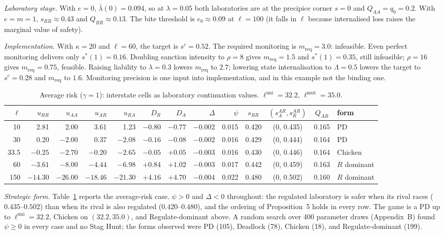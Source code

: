 \documentclass[11pt]{article}
\theoremstyle{plain}
\theoremstyle{definition}
\theoremstyle{remark}
\newcommand{\Lam}{\Lambda}
\newcommand{\Delt}{\Delta}
\newcommand{\lbar}{\bar\lambda}
\begin{document}
\emph{Laboratory stage.} With $e=0$, $\lbar(0)=0.094$, so at $\lambda=0.05$ both laboratories are at the precipice corner $s=0$ and $Q_{AA}=q_0=0.2$. With $e=m=1$, $s_{RR}\approx0.43$ and $Q_{RR}\approx0.13$. The bite threshold is $e_0\approx0.09$ at $\ell=100$ (it falls in $\ell$ because internalised loss raises the marginal value of safety).

\emph{Implementation.} With $\kappa=20$ and $\ell=60$, the target is $s^c=0.52$. The required monitoring is $m_{\mathrm{req}}=3.0$: infeasible. Even perfect monitoring delivers only $s^*(1)=0.16$. Doubling sanction intensity to $\rho=8$ gives $m_{\mathrm{req}}=1.5$ and $s^*(1)=0.35$, still infeasible; $\rho=16$ gives $m_{\mathrm{req}}=0.75$, feasible. Raising liability to $\lambda=0.3$ lowers $m_{\mathrm{req}}$ to $2.7$; lowering state internalisation to $\Lam=0.5$ lowers the target to $s^c=0.28$ and $m_{\mathrm{req}}$ to $1.6$. Monitoring precision is one input into implementation, and in this example not the binding one.

\begin{table}[t]\centering\footnotesize\setlength{\tabcolsep}{3.5pt}
\caption{Average risk ($\gamma=1$): interstate cells as laboratory continuation values. $\ell^{\mathrm{uni}}=32.2$, $\ell^{\mathrm{mut}}=35.0$.}
\label{tab:base}
\begin{tabular}{r rrrr rr r r ccc l}
\toprule
$\ell$ & $u_{RR}$ & $u_{AA}$ & $u_{AR}$ & $u_{RA}$ & $D_R$ & $D_A$ & $\Delt$ & $\psi$ & $s_{RR}$ & $(s^{AR}_A,s^{AR}_R)$ & $Q_{AR}$ & form\\
\midrule
10 & 2.81 & 2.00 & 3.61 & 1.23 & $-0.80$ & $-0.77$ & $-0.002$ & 0.015 & 0.420 & (0, 0.435) & 0.165 & PD\\
30 & 0.20 & $-2.00$ & 0.37 & $-2.08$ & $-0.16$ & $-0.08$ & $-0.002$ & 0.016 & 0.429 & (0, 0.444) & 0.164 & PD\\
33.5 & $-0.25$ & $-2.70$ & $-0.20$ & $-2.65$ & $-0.05$ & $+0.05$ & $-0.003$ & 0.016 & 0.430 & (0, 0.446) & 0.164 & Chicken\\
60 & $-3.61$ & $-8.00$ & $-4.44$ & $-6.98$ & $+0.84$ & $+1.02$ & $-0.003$ & 0.017 & 0.442 & (0, 0.459) & 0.163 & $R$ dominant\\
150 & $-14.30$ & $-26.00$ & $-18.46$ & $-21.30$ & $+4.16$ & $+4.70$ & $-0.004$ & 0.022 & 0.480 & (0, 0.502) & 0.160 & $R$ dominant\\
\bottomrule
\end{tabular}
\end{table}

\emph{Strategic form.} Table~\ref{tab:base} reports the average-risk case. $\psi>0$ and $\Delt<0$ throughout: the regulated laboratory is safer when its rival races ($0.435$--$0.502$) than when its rival is also regulated ($0.420$--$0.480$), and the ordering of Proposition~5 holds in every row. The game is a PD up to $\ell^{\mathrm{uni}}=32.2$, Chicken on $(32.2,35.0)$, and Regulate-dominant above. A random search over 400 parameter draws (Appendix~B) found $\psi\ge0$ in every case and no Stag Hunt; the forms observed were PD (105), Deadlock (78), Chicken (18), and Regulate-dominant (199).
\end{document}
